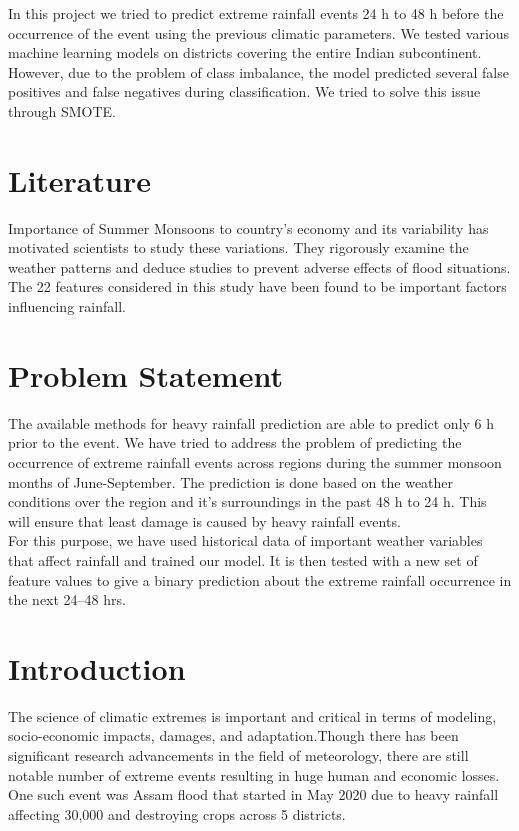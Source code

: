 \documentclass[11pt,a4paper]{article}
\begin{document}
In this project we tried to predict extreme rainfall events 24 h to 48 h before the occurrence of the event using the previous climatic parameters. We tested various machine learning models on districts covering the entire Indian subcontinent. However, due to the problem of class imbalance, the model predicted several false positives and false negatives during classification. We tried to solve this issue through SMOTE.

\section{Literature}
Importance of Summer Monsoons to country's economy and its variability has motivated scientists to study these variations. They rigorously examine the weather patterns and deduce studies to prevent adverse effects of flood situations.\\
The 22 features considered in this study have been found to be important factors influencing rainfall.

 \section{Problem Statement}
The available methods for heavy rainfall prediction are able to predict only 6 h prior to the event. We have tried to address the problem of predicting the occurrence of extreme rainfall events across regions during the summer monsoon months of June-September. The prediction is done based on the weather conditions over the region and it’s surroundings in the past 48 h to 24 h. This will ensure that least damage is caused by heavy rainfall events.
 \\
 
 For this purpose, we have used historical data of important weather variables that affect rainfall and trained our model. It is then tested with a new set of feature values to give a binary prediction about the extreme rainfall occurrence in the next 24–48 hrs.
 
\section{Introduction}
The science of climatic extremes is important and critical in terms of modeling, socio-economic impacts, damages, and adaptation.Though there has been significant research advancements in the field of meteorology, there are still notable number of extreme events resulting in huge human and economic losses. One such event was Assam flood that started in May 2020 due to heavy rainfall affecting 30,000 and destroying crops across 5 districts.\\
\end{document}
